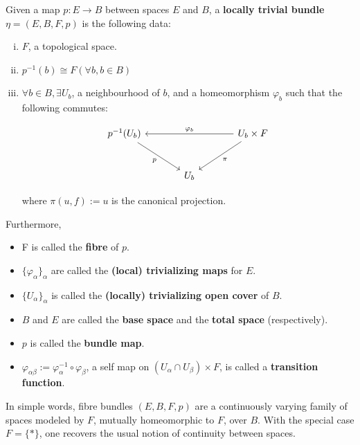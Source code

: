 \documentclass[11pt,a4paper]{article}
\begin{document}
\begin{definition}
Given a map $p:E\to B$ between spaces $E$ and $B$, a \textbf{locally trivial bundle} $\eta = (E, B, F, p)$ is the following data:

\begin{enumerate}[(i)]
    \item $F$, a topological space.

    \item $p^{-1}(b) \cong F   (\forall b, b \in B)$

    \item $\forall b \in B, \exists  U_b$, a neighbourhood of $b$, and a homeomorphism $\varphi_b$ such that the following commutes:

  $$\begin{tikzcd}[column sep = large, row sep = large]
        p^{-1}(U_b) \arrow[rd, "p"']
        && U_b \cross F \arrow[ld, "\pi"] \arrow[ll, "\varphi_b"'] \\
        & U_b
    \end{tikzcd}$$


where $\pi(u,f):=u$ is the canonical projection.
\end{enumerate}

Furthermore,

\begin{itemize}
    \item F is called the \textbf{fibre} of $p$.
    \item $\{\varphi_{\alpha}\}_{\alpha}$ are called the \textbf{(local) trivializing maps} for $E$.
    \item $\{U_{\alpha}\}_{\alpha}$ is called the \textbf{(locally) trivializing open cover} of $B$.
    \item $B$ and $E$ are called the \textbf{base space} and the \textbf{total space} (respectively).
    \item $p$ is called the \textbf{bundle map}.
    \item $\varphi_{\alpha \beta}:= \varphi_{\alpha}^{-1}\circ \varphi_{\beta}$, a self map on $(U_{\alpha}\cap U_{\beta})\times F$, is called a \textbf{transition function}.
\end{itemize}
\end{definition}

In simple words, fibre bundles $(E, B, F, p)$ are a continuously varying family of spaces modeled by $F$, mutually homeomorphic to $F$, over $B$. With the special case $F = \{*\}$, one recovers the usual notion of continuity between spaces.
\end{document}
